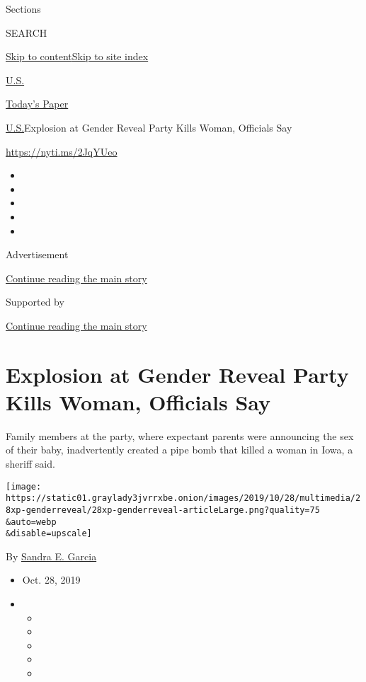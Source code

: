 Sections

SEARCH

\protect\hyperlink{site-content}{Skip to
content}\protect\hyperlink{site-index}{Skip to site index}

\href{https://www.nytimes3xbfgragh.onion/section/us}{U.S.}

\href{https://myaccount.nytimes3xbfgragh.onion/auth/login?response_type=cookie\&client_id=vi}{}

\href{https://www.nytimes3xbfgragh.onion/section/todayspaper}{Today's
Paper}

\href{/section/us}{U.S.}\textbar{}Explosion at Gender Reveal Party Kills
Woman, Officials Say

\url{https://nyti.ms/2JqYUeo}

\begin{itemize}
\item
\item
\item
\item
\item
\end{itemize}

Advertisement

\protect\hyperlink{after-top}{Continue reading the main story}

Supported by

\protect\hyperlink{after-sponsor}{Continue reading the main story}

\hypertarget{explosion-at-gender-reveal-party-kills-woman-officials-say}{%
\section{Explosion at Gender Reveal Party Kills Woman, Officials
Say}\label{explosion-at-gender-reveal-party-kills-woman-officials-say}}

Family members at the party, where expectant parents were announcing the
sex of their baby, inadvertently created a pipe bomb that killed a woman
in Iowa, a sheriff said.

\texttt{[image: https://static01.graylady3jvrrxbe.onion/images/2019/10/28/multimedia/28xp-genderreveal/28xp-genderreveal-articleLarge.png?quality=75\\\&auto=webp\\\&disable=upscale]}

By \href{https://www.nytimes3xbfgragh.onion/by/sandra-e-garcia}{Sandra
E. Garcia}

\begin{itemize}
\item
  Oct. 28, 2019
\item
  \begin{itemize}
  \item
  \item
  \item
  \item
  \item
  \end{itemize}
\end{itemize}

